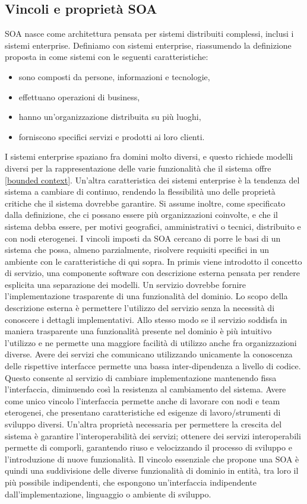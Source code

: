 \documentclass[12pt]{report}
\begin{document}
\subsection{Vincoli e proprietà SOA}
SOA nasce come architettura pensata per sistemi distribuiti complessi, inclusi i sistemi enterprise.
Definiamo con sistemi enterprise, riassumendo la definizione proposta in \cite{eneterpiseSysRood} come sistemi con le seguenti caratteristiche:
\begin{itemize}
    \item sono composti da persone, informazioni e tecnologie,
    \item effettuano operazioni di business,
    \item hanno un'organizzazione distribuita su più luoghi,
    \item forniscono specifici servizi e prodotti ai loro clienti.
\end{itemize}
I sistemi enterprise spaziano fra domini molto diversi, e questo richiede modelli diversi per la rappresentazione delle varie funzionalità che il sistema offre \ref{bounded context}.
Un'altra caratteristica dei sistemi enterprise è la tendenza del sistema a cambiare di continuo, rendendo la flessibilità uno delle proprietà critiche che il sistema dovrebbe garantire.
Si assume inoltre, come specificato dalla definizione, che ci possano essere più organizzazioni coinvolte, e che il sistema debba essere, per motivi geografici, amministrativi o tecnici, distribuito e con nodi eterogenei.
I vincoli imposti da SOA cercano di porre le basi di un sistema che possa, almeno parzialmente, risolvere requisiti specifici in un ambiente con le caratteristiche di qui sopra.
In primis viene introdotto il concetto di servizio, una componente software con descrizione esterna pensata per rendere esplicita una separazione dei modelli.
Un servizio dovrebbe fornire l'implementazione trasparente di una funzionalità del dominio.
Lo scopo della descrizione esterna è permettere l'utilizzo del servizio senza la necessità di conoscere i dettagli implementativi.
Allo stesso modo se il servizio soddisfa in maniera trasparente una funzionalità presente nel dominio è più intuitivo l'utilizzo e ne permette una maggiore facilità di utilizzo anche fra organizzazioni diverse.  
Avere dei servizi che comunicano utilizzando unicamente la conoscenza delle rispettive interfacce permette una bassa inter-dipendenza a livello di codice.
Questo consente al servizio di cambiare implementazione mantenendo fissa l'interfaccia, diminuendo così la resistenza al cambiamento del sistema.
Avere come unico vincolo l'interfaccia permette anche di lavorare con nodi e team eterogenei, che presentano caratteristiche ed esigenze di lavoro/strumenti di sviluppo diversi.
Un'altra proprietà necessaria per permettere la crescita del sistema è garantire l'interoperabilità dei servizi; ottenere dei servizi interoperabili permette di comporli, garantendo riuso e velocizzando il processo di sviluppo e l'introduzione di nuove funzionalità. 
Il vincolo essenziale che propone una SOA è quindi una suddivisione delle diverse funzionalità di dominio in entità, tra loro il più possibile indipendenti, che espongono un'interfaccia indipendente dall'implementazione, linguaggio o ambiente di sviluppo. 
\end{document}

